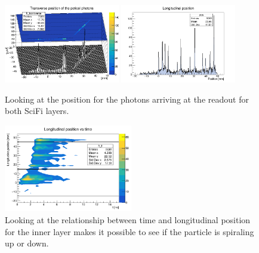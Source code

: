 \begin{refsection}
\begin{figure}
    \centering
    \includegraphics[width=0.45\textwidth]{Figures/muEDM/Tracker/fPosInXfPosInZ.png}
    \includegraphics[width=0.45\textwidth]{Figures/muEDM/Tracker/fPosInY.png}
    \caption{Looking at the position for the photons arriving at the readout for both SciFi layers. 
}
    \label{fig:geant4_position}
\end{figure}

\begin{figure}
    \centering
    \includegraphics[width=0.5\textwidth]{Figures/muEDM/Tracker/fPosInYfTimeIn.png}
    \caption{Looking at the relationship between time and longitudinal position for the inner layer makes it possible to see if the particle is spiraling up or down.}
    \label{fig:geant4_time_pos}
\end{figure}


\end{refsection}
